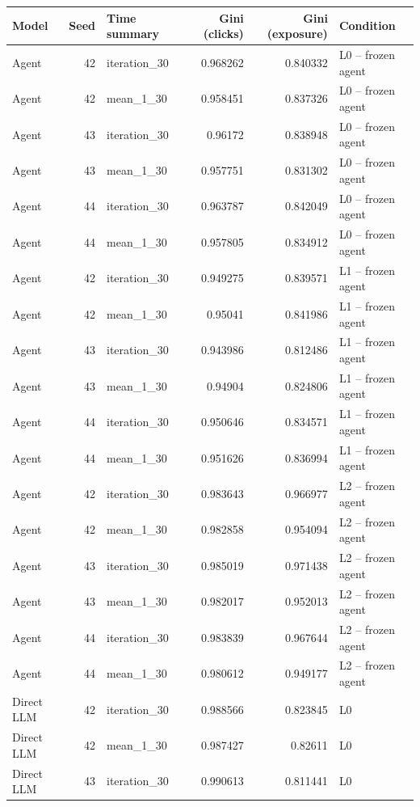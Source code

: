 \begin{table}[htbp!]
\centering
\small
\setlength{\tabcolsep}{3pt}
\renewcommand{\arraystretch}{1.1}
\begin{tabular}{lrlrrl}
\hline
Model & Seed & Time summary & Gini (clicks) & Gini (exposure) & Condition \\
\hline
Agent & 42 & iteration\_30 & 0.968262 & 0.840332 & L0 -- frozen agent \\
Agent & 42 & mean\_1\_30 & 0.958451 & 0.837326 & L0 -- frozen agent \\
Agent & 43 & iteration\_30 & 0.96172 & 0.838948 & L0 -- frozen agent \\
Agent & 43 & mean\_1\_30 & 0.957751 & 0.831302 & L0 -- frozen agent \\
Agent & 44 & iteration\_30 & 0.963787 & 0.842049 & L0 -- frozen agent \\
Agent & 44 & mean\_1\_30 & 0.957805 & 0.834912 & L0 -- frozen agent \\
Agent & 42 & iteration\_30 & 0.949275 & 0.839571 & L1 -- frozen agent \\
Agent & 42 & mean\_1\_30 & 0.95041 & 0.841986 & L1 -- frozen agent \\
Agent & 43 & iteration\_30 & 0.943986 & 0.812486 & L1 -- frozen agent \\
Agent & 43 & mean\_1\_30 & 0.94904 & 0.824806 & L1 -- frozen agent \\
Agent & 44 & iteration\_30 & 0.950646 & 0.834571 & L1 -- frozen agent \\
Agent & 44 & mean\_1\_30 & 0.951626 & 0.836994 & L1 -- frozen agent \\
Agent & 42 & iteration\_30 & 0.983643 & 0.966977 & L2 -- frozen agent \\
Agent & 42 & mean\_1\_30 & 0.982858 & 0.954094 & L2 -- frozen agent \\
Agent & 43 & iteration\_30 & 0.985019 & 0.971438 & L2 -- frozen agent \\
Agent & 43 & mean\_1\_30 & 0.982017 & 0.952013 & L2 -- frozen agent \\
Agent & 44 & iteration\_30 & 0.983839 & 0.967644 & L2 -- frozen agent \\
Agent & 44 & mean\_1\_30 & 0.980612 & 0.949177 & L2 -- frozen agent \\
Direct LLM & 42 & iteration\_30 & 0.988566 & 0.823845 & L0 \\
Direct LLM & 42 & mean\_1\_30 & 0.987427 & 0.82611 & L0 \\
Direct LLM & 43 & iteration\_30 & 0.990613 & 0.811441 & L0 \\

\end{tabular}
\end{table}

